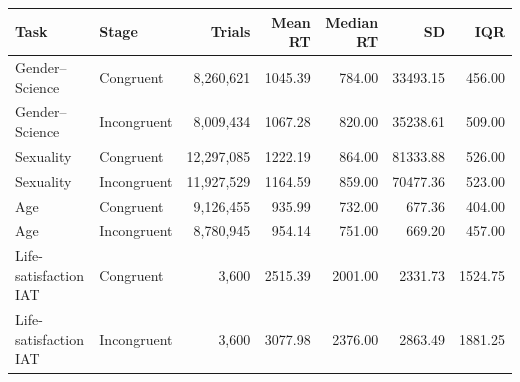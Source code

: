 \begin{tabular}{@{}llrrrrr@{}}
\toprule
Task & Stage & Trials & Mean RT & Median RT & SD & IQR \\
\midrule
Gender--Science & Congruent & 8,260,621 & 1045.39 & 784.00 & 33493.15 & 456.00 \\
Gender--Science & Incongruent & 8,009,434 & 1067.28 & 820.00 & 35238.61 & 509.00 \\
Sexuality & Congruent & 12,297,085 & 1222.19 & 864.00 & 81333.88 & 526.00 \\
Sexuality & Incongruent & 11,927,529 & 1164.59 & 859.00 & 70477.36 & 523.00 \\
Age & Congruent & 9,126,455 & 935.99 & 732.00 & 677.36 & 404.00 \\
Age & Incongruent & 8,780,945 & 954.14 & 751.00 & 669.20 & 457.00 \\
Life-satisfaction IAT & Congruent & 3,600 & 2515.39 & 2001.00 & 2331.73 & 1524.75 \\
Life-satisfaction IAT & Incongruent & 3,600 & 3077.98 & 2376.00 & 2863.49 & 1881.25 \\
\bottomrule
\end{tabular}